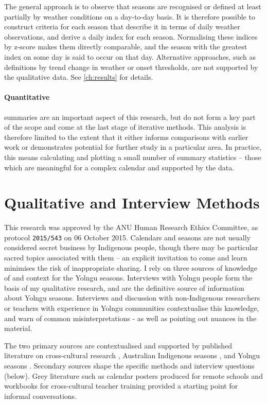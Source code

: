 The general approach is to observe that seasons are recognised or defined
at least partially by weather conditions on a day-to-day basis.  It is
therefore possible to construct criteria for each season that describe
it in terms of daily weather observations, and derive a daily index for
each season.  Normalising these indices by z-score makes them directly
comparable, and the season with the greatest index on some day is said
to occur on that day.
%
Alternative approaches, such as definitions by trend change in weather
or onset thresholds, are not supported by the qualitative data.  See
\cref{ch:results} for details.


\paragraph{Quantitative} summaries are an important aspect of this
research, but do not form a key part of the scope and come at the
last stage of iterative methods.  This analysis is therefore
limited to the extent that it either informs comparisons with earlier work
or demonstrates potential for further study in a particular area.
In practice, this means calculating and plotting a small number of summary statistics
-- those which are meaningful for a complex calendar and supported by the
data.



\section{Qualitative and Interview Methods}

This research was approved by the ANU Human Research Ethics Committee,
as protocol \texttt{2015/543} on 06 October 2015.
Calendars and seasons are not usually considered secret business by Indigenous people, though
there may be particular sacred topics associated with them -- an explicit
invitation to come and learn minimises the risk of inappropriate sharing.
%
I rely on three sources of knowledge of and context for the Yolngu
seasons.  Interviews with Yolngu people form the basis of my qualitative
research, and are the definitive source of information about Yolngu seasons.
Interviews and discussion with non-Indigenous researchers or teachers with
experience in Yolngu communities contextualise this knowledge, and warn of
common misinterpretations - as well as pointing out nuances in the material.

The two primary sources are contextualised and supported by published
literature on cross-cultural research \citep[eg.][]{smith1999}, Australian
Indigenous seasons \citep[eg.][]{prober2011,oconnor2010}, and Yolngu seasons
\citep{davis1989,atlas2014}.  Secondary sources shape the specific methods
and interview questions (below).  Grey literature such as calendar posters
produced for remote schools and workbooks for cross-cultural teacher
training provided a starting point for informal conversations.



